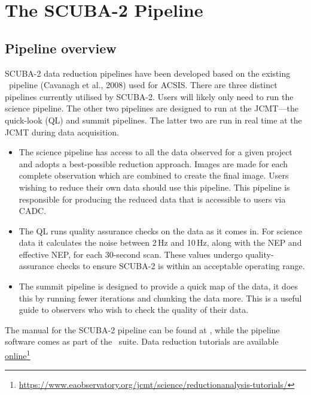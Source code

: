 \chapter{The SCUBA-2 Pipeline}
\label{sec:pipe}

\section{Pipeline overview}

SCUBA-2 data reduction pipelines have been developed based on the
existing \oracdr\ pipeline (Cavanagh et al., 2008\cite{oracdr}) used
for ACSIS. There are three distinct pipelines currently utilised by
SCUBA-2. Users will likely only need to run the science pipeline. The
other two pipelines are designed to run at the JCMT---the quick-look (QL) and
summit pipelines. The latter two are run in real time at the JCMT
during data acquisition.

\begin{itemize}
\item The science pipeline has access to all the data observed for a
given project and adopts a best-possible reduction approach. Images are
made for each complete observation which are combined to create the final
image. Users wishing to reduce their own data should use this pipeline.
This pipeline is responsible for producing the reduced data that is
accessible to users via CADC.
\item The QL runs quality assurance checks on the data as it comes in.
For science data it calculates the noise between 2\,Hz and 10\,Hz,
along with the NEP and effective NEP, for each 30-second scan. These
values undergo quality-assurance checks to ensure SCUBA-2 is within
an acceptable operating range.
\item The summit pipeline is designed to provide a quick map of the
data, it does this by running fewer iterations and chunking the data
more. This is a useful guide to observers who wish to check the
quality of their data.

\end{itemize}

The manual for the SCUBA-2 pipeline can be found at \pipelinesun,
while the pipeline software comes as part of the \starlink\ suite. Data
reduction tutorials are available 
\href{https://www.eaobservatory.org/jcmt/science/reductionanalysis-tutorials/}{online}\footnote{
\url{https://www.eaobservatory.org/jcmt/science/reductionanalysis-tutorials/}}

